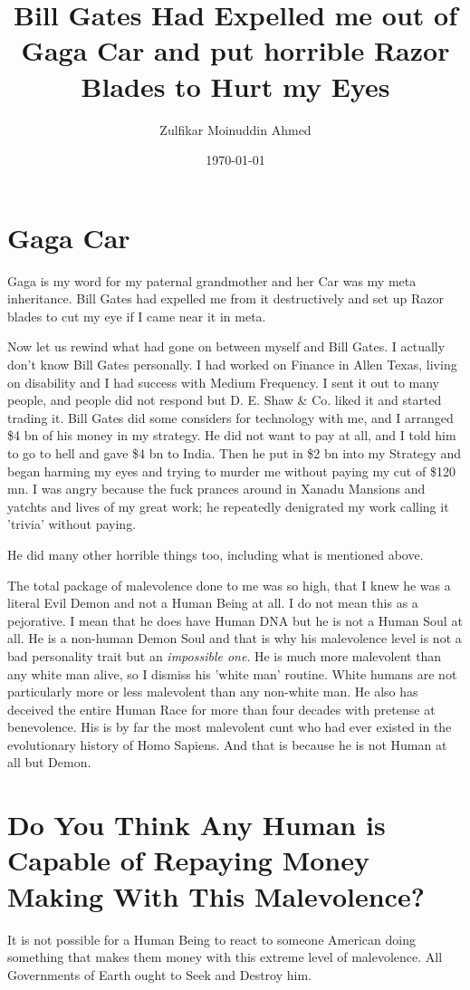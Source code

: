 \documentclass{amsart}
\title{Bill Gates Had Expelled me out of Gaga Car and put horrible Razor Blades to Hurt my Eyes}
\author{Zulfikar Moinuddin Ahmed}
\date{\today}
\begin{document}
\maketitle

\section{Gaga Car}

Gaga is my word for my paternal grandmother and her Car was my meta inheritance.  Bill Gates had expelled me from it destructively and set up Razor blades to cut my eye if I came near it in meta.

Now let us rewind what had gone on between myself and Bill Gates.  I actually don't know Bill Gates personally.  I had worked on Finance in Allen Texas, living on disability and I had success with Medium Frequency.  I sent it out to many people, and people did not respond but D. E. Shaw \& Co. liked it and started trading it.  Bill Gates did some considers for technology with me, and I arranged \$4 bn of his money in my strategy.  He did not want to pay at all, and I told him to go to hell and gave \$4 bn to India.  Then he put in \$2 bn into my Strategy and began harming my eyes and trying to murder me without paying my cut of \$120 mn.  I was angry because the fuck prances around in Xanadu Mansions and yatchts and lives of my great work; he repeatedly denigrated my work calling it 'trivia' without paying.  

He did many other horrible things too, including what is mentioned above.  

The total package of malevolence done to me was so high, that I knew he was a literal Evil Demon and not a Human Being at all.  I do not mean this as a pejorative.  I mean that he does have Human DNA but he is not a Human Soul at all.  He is a non-human Demon Soul and that is why his malevolence level is not a bad personality trait but an {\em impossible one}.  He is much more malevolent than any white man alive, so I dismiss his 'white man' routine.  White humans are not particularly more or less malevolent than any non-white man.  He also has deceived the entire Human Race for more than four decades with pretense at benevolence.  His is by far the most malevolent cunt who had ever existed in the evolutionary history of Homo Sapiens.  And that is because he is not Human at all but Demon. 

\section{Do You Think Any Human is Capable of Repaying Money Making With This Malevolence?}

It is not possible for a Human Being to react to someone American doing something that makes them money with this extreme level of malevolence.  All Governments of Earth ought to Seek and Destroy him.
\end{document}

